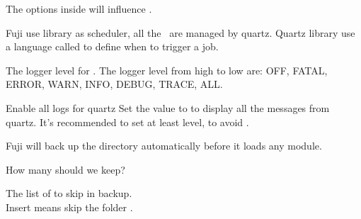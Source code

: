 \label{ch:configuration}



\begin{Configuration}
    \item[common]{
        The  options inside  will influence .

        \begin{NestedList}
            \item[quartz]{
                Fuji use  library as scheduler, all the~ are managed by quartz.
                Quartz library use a language called  to define when to trigger a job.

                \begin{NestedList}
                    \item[logger\_level]
                    The logger level for .
                    The logger level from high to low are: OFF, FATAL, ERROR, WARN, INFO, DEBUG, TRACE, ALL.

                    \begin{example}{Enable all logs for quartz}
                        Set the value to  to display all the messages from quartz.
                        It's recommended to set at least  level, to avoid .
                    \end{example}

                \end{NestedList}

            }
        \end{NestedList}

        \begin{NestedList}
            \item[backup]{
                Fuji will back up the  directory automatically before it loads any module.

                \begin{NestedList}
                    \item[max\_slots]{
                        How many  should we keep?
                    }

                    \item[skip]{
                        The list of  to skip in backup. \\
                        Insert  means skip the folder .
                    }
                \end{NestedList}
            }
        \end{NestedList}

}
\end{Configuration}
